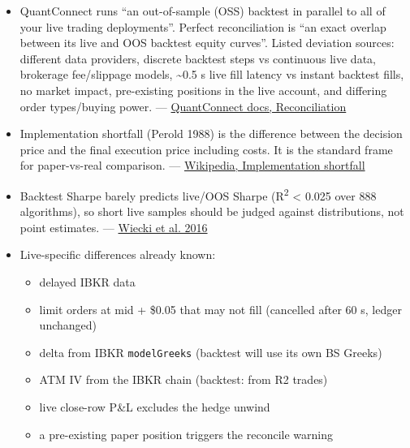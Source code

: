 \documentclass{article}
\begin{document}
\begin{itemize}

\item QuantConnect runs ``an out-of-sample (OSS) backtest in parallel to all of your live trading deployments''. Perfect reconciliation is ``an exact overlap between its live and OOS backtest equity curves''. Listed deviation sources: different data providers, discrete backtest steps vs continuous live data, brokerage fee/\allowbreak{}slippage models, \textasciitilde{}0.5 s live fill latency vs instant backtest fills, no market impact, pre-existing positions in the live account, and differing order types/\allowbreak{}buying power. --- \href{https://www.quantconnect.com/docs/v2/cloud-platform/live-trading/reconciliation}{QuantConnect docs, Reconciliation}

\item Implementation shortfall (Perold 1988) is the difference between the decision price and the final execution price including costs. It is the standard frame for paper-vs-real comparison. --- \href{https://en.wikipedia.org/wiki/Implementation_shortfall}{Wikipedia, Implementation shortfall}

\item Backtest Sharpe barely predicts live/\allowbreak{}OOS Sharpe (R\textsuperscript{2} < 0.025 over 888 algorithms), so short live samples should be judged against distributions, not point estimates. --- \href{https://www.pm-research.com/content/iijinvest/25/3/69}{Wiecki et al. 2016}

\item [REPO] Live-specific differences already known:

\begin{itemize}

\item delayed IBKR data

\item limit orders at mid + \$0.05 that may not fill (cancelled after 60 s, ledger unchanged)

\item delta from IBKR \texttt{modelGreeks} (backtest will use its own BS Greeks)

\item ATM IV from the IBKR chain (backtest: from R2 trades)

\item live close-row P\&L excludes the hedge unwind

\item a pre-existing paper position triggers the reconcile warning

\end{itemize}

\end{itemize}
\end{document}
